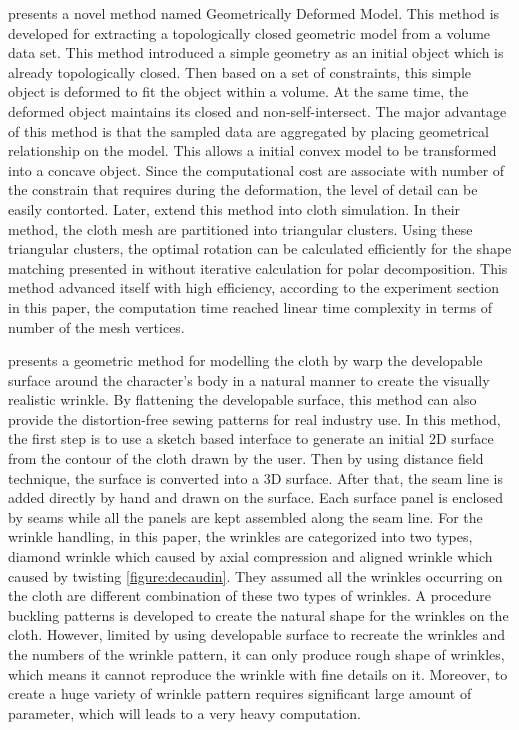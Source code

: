 \cite{Miller:1991} presents a novel method named Geometrically Deformed Model. This method is developed for extracting a topologically closed geometric model from a volume data set. This method introduced a simple geometry as an initial object which is already topologically closed. Then based on a set of constraints, this simple object is deformed to fit the object within a volume. At the same time, the deformed object maintains its closed and non-self-intersect.  The major advantage of this method is that the sampled data are aggregated by placing geometrical relationship on the model. This allows a initial convex model to be transformed into a concave object. Since the computational cost are associate with number of the constrain that requires during the deformation, the level of detail can be easily contorted. Later, \cite{Thomas2008} extend this method into cloth simulation. In their method, the cloth mesh are partitioned into triangular clusters. Using these triangular clusters, the optimal rotation can be calculated efficiently for the shape matching presented in \cite{Miller:1991} without iterative calculation for polar decomposition. This method advanced itself with high efficiency, according to the experiment section in this paper, the computation time reached linear time complexity in terms of number of the mesh vertices. 


\cite{DJWBSC06} presents a geometric method for modelling the cloth by warp the developable surface around the character's body in a natural manner to create the visually realistic wrinkle. By flattening the developable surface, this method can also provide the distortion-free sewing patterns for real industry use. In this method, the first step is to use a sketch based interface to generate an initial 2D surface from the contour of the cloth drawn by the user. Then by using distance field technique, the surface is converted into a 3D surface. After that, the seam line is added directly by hand and drawn on the surface. Each surface panel is enclosed by seams while all the panels are kept assembled along the seam line. For the wrinkle handling, in this paper, the wrinkles are categorized into two types, diamond wrinkle which caused by axial compression and aligned wrinkle which caused by twisting \ref{figure:decaudin}. They assumed all the wrinkles occurring on the cloth are different combination of these two types of wrinkles. A procedure buckling patterns is developed to create the natural shape for the wrinkles on the cloth. However, limited by using developable surface to recreate the wrinkles and the numbers of the wrinkle pattern, it can only produce rough shape of wrinkles, which means it cannot reproduce the wrinkle with fine details on it. Moreover, to create a huge variety of wrinkle pattern requires significant large amount of parameter, which will leads to a very heavy computation.  


